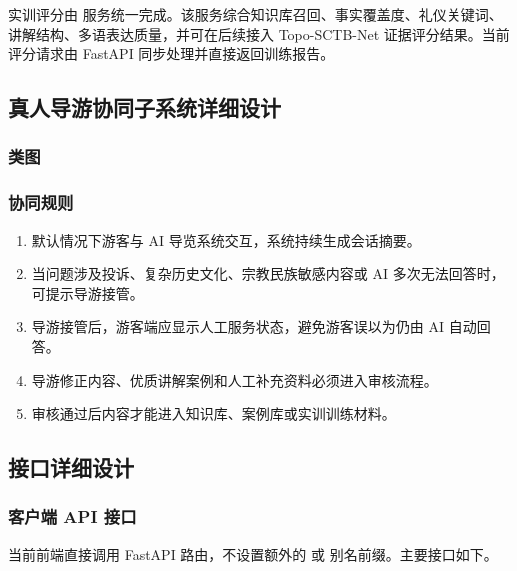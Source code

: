 实训评分由  服务统一完成。该服务综合知识库召回、事实覆盖度、礼仪关键词、讲解结构、多语表达质量，并可在后续接入 Topo-SCTB-Net 证据评分结果。当前评分请求由 FastAPI 同步处理并直接返回训练报告。
\newpage
\subsection{真人导游协同子系统详细设计}

\subsubsection{类图}


\subsubsection{协同规则}

\begin{enumerate}
  \item 默认情况下游客与 AI 导览系统交互，系统持续生成会话摘要。
  \item 当问题涉及投诉、复杂历史文化、宗教民族敏感内容或 AI 多次无法回答时，可提示导游接管。
  \item 导游接管后，游客端应显示人工服务状态，避免游客误以为仍由 AI 自动回答。
  \item 导游修正内容、优质讲解案例和人工补充资料必须进入审核流程。
  \item 审核通过后内容才能进入知识库、案例库或实训训练材料。
\end{enumerate}

\subsection{接口详细设计}

\subsubsection{客户端 API 接口}

当前前端直接调用 FastAPI 路由，不设置额外的  或  别名前缀。主要接口如下。


